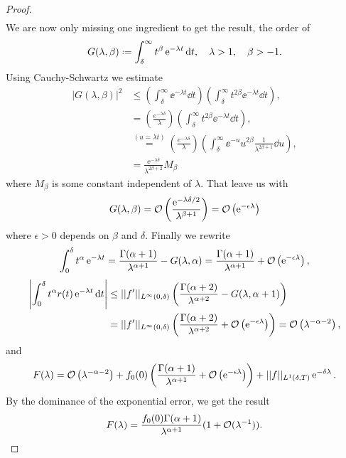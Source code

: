 \begin{proof}
\begin{align}
	\end{align}
	We are now only missing one ingredient to get the result, the order of
	\begin{equation}
		G(\lambda, \beta) \deff \int_{\delta}^{\infty} t^{\beta} \ee^{-\lambda t} \dd t, \ \ \ \lambda > 1, \quad \beta > -1. 
	\end{equation}
	Using Cauchy-Schwartz we estimate
		\begin{align}
			|G(\lambda, \beta)|^2 & \leq \left( \int_{\delta}^{\infty} \ee^{-\lambda t} \dd t \right) \left(\int_{\delta}^{\infty} t^{2\beta} \ee^{-\lambda t} \dd t \right), \\
			& = \left(\frac{e^{-\lambda \delta}}{\lambda}\right) \left( \int_{\delta}^{\infty} t^{2\beta} \ee^{-\lambda t}\dd t \right),	\\
			& \stackrel{(u=\lambda t)}{=} \left(\frac{e^{-\lambda \delta}}{\lambda}\right) \left( \int_{\delta}^{\infty} \ee^{-u} u^{2\beta} \frac{1}{\lambda^{2\beta + 1}} \dd u \right), \\
			& = \frac{\ee^{-\lambda \delta}}{\lambda^{2\beta + 2}} M_\beta
		\end{align}
	where $M_\beta$ is some constant independent of $\lambda$. That leave us with
	\begin{equation}
		G(\lambda, \beta) = \Boh\left(\frac{\ee^{-\lambda\delta/2}}{\lambda^{\beta+1}}\right) = \Boh\left(\ee^{-\epsilon\lambda}\right)
	\end{equation}
	where $\epsilon > 0$ depends on $\beta$ and $\delta$. Finally we rewrite
	\begin{equation}
		\int_{0}^{\delta} t^\alpha \ee^{-\lambda t}  = \frac{\Gamma(\alpha + 1)}{\lambda^{\alpha +1}} - G(\lambda, \alpha) =  \frac{\Gamma(\alpha + 1)}{\lambda^{\alpha+1}} + \Boh\left(\ee^{-\epsilon\lambda}\right),
	\end{equation}
	\begin{align}
		\left|\int_{0}^{\delta} t^\alpha r(t) \ee^{-\lambda t} \dd t \right| & \leq \normL{\infty}{f'}{(0, \delta)} \left( \frac{\Gamma(\alpha + 2)}{\lambda^{\alpha +2}} - G(\lambda, \alpha + 1) \right) \\
		&  =  \normL{\infty}{f'}{(0, \delta)} \left( \frac{\Gamma(\alpha + 2)}{\lambda^{\alpha +2}} + \Boh\left(\ee^{-\epsilon\lambda}\right) \right) = \Boh\left(\lambda^{-\alpha-2}\right),
	\end{align}
	and
	\begin{equation}
		F(\lambda) = \Boh\left(\lambda^{-\alpha-2}\right) + f_0(0) \left( \frac{\Gamma(\alpha + 1)}{\lambda^{\alpha+1}} + \Boh\left(\ee^{-\epsilon\lambda}\right) \right) + \normL{1}{f}{(\delta, T)} \ee^{-\delta \lambda}.
	\end{equation}
	By the dominance of the exponential error, we get the result
	\begin{equation}
		F(\lambda) = \frac{f_0(0) \Gamma(\alpha + 1)}{\lambda^{\alpha + 1}} (1 + \Boh(\lambda^{-1})).
	\end{equation}
\end{proof}

